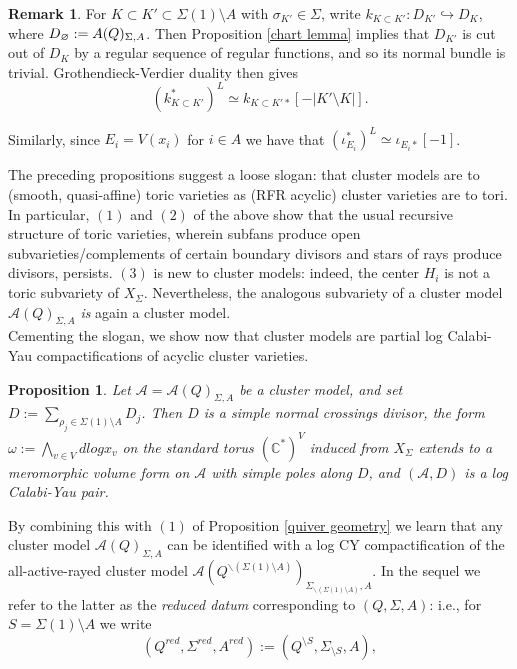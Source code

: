 \documentclass[11pt]{amsart}
\newtheorem{prop}[thm]{Proposition}
\theoremstyle{definition}
\newtheorem{rem}[thm]{Remark}
\theoremstyle{remark}
\newcommand{\A}{\mathcal{A}}
\renewcommand{\emptyset}{\varnothing}
\numberwithin{equation}{section}
\begin{document}
\begin{rem}\label{GV duality remark}
    For $K\subset K'\subset \Sigma(1)\setminus A$ with $\sigma_{K'}\in \Sigma$, write $k_{K\subset K'}\colon D_{K'}\hookrightarrow D_K$, where $D_\emptyset:=\mathcal \A(Q)_{\Sigma,A}$. Then Proposition \ref{chart lemma} implies that $D_{K'}$ is cut out of $D_K$ by a regular sequence of regular functions, and so its normal bundle is trivial. Grothendieck-Verdier duality then gives
$$(k^*_{K\subset K'})^L\simeq k_{K\subset K'*}[-|K'\setminus K|].$$

Similarly, since $E_i=V(x_i)$ for $i\in A$ we have that $(\iota_{E_i}^*)^L\simeq\iota_{E_i*}[-1]$.
\end{rem}

The preceding propositions suggest a loose slogan: that cluster models are to (smooth, quasi-affine) toric varieties as (RFR acyclic) cluster varieties are to tori. In particular, $(1)$ and $(2)$ of the above show that the usual recursive structure of toric varieties, wherein subfans produce open subvarieties/complements of certain boundary divisors and stars of rays produce divisors, persists. $(3)$ is new to cluster models: indeed, the center $H_i$ is not a toric subvariety of $X_\Sigma$. Nevertheless, the analogous subvariety of a cluster model $\mathcal{A}(Q)_{\Sigma, A}$ \textit{is} again a cluster model.\\

Cementing the slogan, we show now that cluster models are partial log Calabi-Yau compactifications of acyclic cluster varieties.

\begin{prop}\label{CY prop}
    Let $\A = \mathcal{A}(Q)_{\Sigma, A}$ be a cluster model, and set $D := \sum_{\rho_j \in \Sigma(1) \setminus A} D_j$. Then $D$ is a simple normal crossings divisor, the form $\omega := \bigwedge_{v \in V} dlog x_v$ on the standard torus $(\mathbb{C}^*)^V$ induced from $X_\Sigma$ extends to a meromorphic volume form on $\A$ with simple poles along $D$, and $(\A, D)$ is a log Calabi-Yau pair.
\end{prop}

By combining this with $(1)$ of Proposition \ref{quiver geometry} we learn that any cluster model $\mathcal{A}(Q)_{\Sigma, A}$ can be identified with a log CY compactification of the all-active-rayed cluster model $\mathcal{A}(Q^{\backslash (\Sigma(1) \setminus A)})_{\Sigma_{\backslash (\Sigma(1) \setminus A)}, A}$. In the sequel we refer to the latter as the \textit{reduced datum} corresponding to $(Q, \Sigma, A)$: i.e., for $S = \Sigma(1) \setminus A$ we write $$(Q^{red}, \Sigma^{red}, A^{red}) := (Q^{\setminus S},\Sigma_{\setminus S},A),$$
\end{document}
